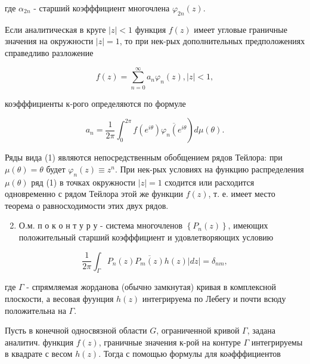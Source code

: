 \documentclass[10pt]{article}
\begin{document}
где $\alpha_{2 n}$ - старший коэфффициент многочлена $\varphi_{2 n}(z)$.



Если аналитическая в круге $|z|<1$ функция $f(z)$ имеет угловые граничные значения на окружности $|z|=1$, то при нек-рых дополнительных предположениях справедливо разложение



\[

f(z)=\sum_{n=0}^{\infty} a_{n} \varphi_{n}(z),|z|<1,

\]



коэфффициенты к-рого определяются по формуле



\[

\left.a_{n}=\frac{1}{2 \pi} \int_{0}^{2 \pi} f\left(e^{i \theta}\right) \overline{\varphi_{n}\left(e^{i \theta}\right.}\right) d \mu(\theta) .

\]



Ряды вида (1) являются непосредственным обобщением рядов Тейлора: при $\mu(\theta)=\theta$ будет $\varphi_{n}(z) \equiv z^{n}$. При нек-рых условиях на функцию распределения $\mu(\theta)$ ряд (1) в точках окружности $|z|=1$ сходится или расходится одновременно с рядом Тейлора этой же функции $f(z)$, т. е. имеет место теорема о равносходимости этих двух рядов.



\begin{enumerate}

  \setcounter{enumi}{1}

  \item О.м. п о к о н т у р у - система многочленов $\left\{P_{n}(z)\right\}$, имеющих положительный старший коэфффициент и удовлетворяющих условию

\end{enumerate}



\[

\frac{1}{2 \pi} \int_{\Gamma} P_{n}(z) \overline{P_{m}(z)} h(z)|d z|=\delta_{n m},

\]



где $\Gamma$ - спрямляемая жорданова (обычно замкнутая) кривая в комплексной плоскости, а весовая фуунция $h(z)$ интегрируема по Лебегу и почти всюду положительна на $\Gamma$.



Пусть в конечной односвязной области $G$, ограниченной кривой $\Gamma$, задана аналитич. функция $f(z)$, граничные значения к-рой на контуре $\Gamma$ интегрируемы в квадрате с весом $h(z)$. Тогда с помощью формулы для коәфффициентов
\end{document}
